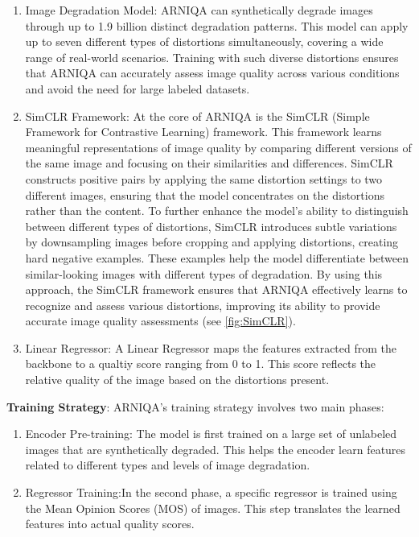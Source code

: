 \begin{enumerate}
    \item Image Degradation Model: ARNIQA can synthetically degrade images through up to 1.9 billion distinct degradation patterns. This model can apply up to seven different types of distortions simultaneously, covering a wide range of real-world scenarios. Training with such diverse distortions ensures that ARNIQA can accurately assess image quality across various conditions and avoid the need for large labeled datasets.
    \item SimCLR Framework: At the core of ARNIQA is the SimCLR (Simple Framework for Contrastive Learning) framework. This framework  learns meaningful representations of image quality by comparing different versions of the same image and focusing on their similarities and differences. SimCLR constructs positive pairs by applying the same distortion settings to two different images, ensuring that the model concentrates on the distortions rather than the content. To further enhance  the model’s ability to distinguish between different types of distortions, SimCLR introduces subtle variations by downsampling images before cropping and applying distortions, creating hard negative examples. These examples help the model differentiate between similar-looking images with different types of degradation. By using this approach, the SimCLR framework ensures that ARNIQA effectively learns to recognize and assess various distortions, improving its ability to provide accurate image quality assessments (see \autoref{fig:SimCLR}).
    \item Linear Regressor: A Linear Regressor maps the features extracted from the backbone to a qualtiy score ranging from 0 to 1. This score reflects the relative quality of the image based on the distortions present.
\end{enumerate}
\vspace{\baselineskip}
\noindent
\textbf{Training Strategy}: ARNIQA’s training strategy involves two main phases: \par
\begin{enumerate}
    \item Encoder Pre-training: The model is first trained on a large set of unlabeled images that are synthetically degraded. This helps the encoder learn features related to different types and levels of image degradation.
    \item Regressor Training:In the second phase, a specific regressor is trained using the Mean Opinion Scores (MOS) of images. This step translates the learned features into actual quality scores.
\end{enumerate}
